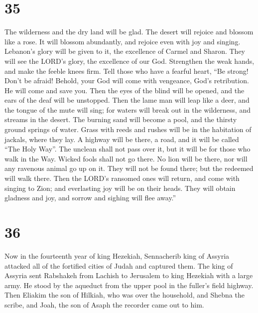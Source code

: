 \hypertarget{section-34}{%
\section{35}\label{section-34}}

 The wilderness and the dry land will be glad. The desert
will rejoice and blossom like a rose.  It will blossom
abundantly, and rejoice even with joy and singing. Lebanon's glory will
be given to it, the excellence of Carmel and Sharon. They will see the
LORD's glory, the excellence of our God.  Strengthen the
weak hands, and make the feeble knees firm.  Tell those
who have a fearful heart, ``Be strong! Don't be afraid! Behold, your God
will come with vengeance, God's retribution. He will come and save you.
 Then the eyes of the blind will be opened, and the ears
of the deaf will be unstopped.  Then the lame man will
leap like a deer, and the tongue of the mute will sing; for waters will
break out in the wilderness, and streams in the desert. 
The burning sand will become a pool, and the thirsty ground springs of
water. Grass with reeds and rushes will be in the habitation of jackals,
where they lay.  A highway will be there, a road, and it
will be called ``The Holy Way''. The unclean shall not pass over it, but
it will be for those who walk in the Way. Wicked fools shall not go
there.  No lion will be there, nor will any ravenous
animal go up on it. They will not be found there; but the redeemed will
walk there.  Then the LORD's ransomed ones will return,
and come with singing to Zion; and everlasting joy will be on their
heads. They will obtain gladness and joy, and sorrow and sighing will
flee away.''

\hypertarget{section-35}{%
\section{36}\label{section-35}}

 Now in the fourteenth year of king Hezekiah, Sennacherib
king of Assyria attacked all of the fortified cities of Judah and
captured them.  The king of Assyria sent Rabshakeh from
Lachish to Jerusalem to king Hezekiah with a large army. He stood by the
aqueduct from the upper pool in the fuller's field highway.
 Then Eliakim the son of Hilkiah, who was over the
household, and Shebna the scribe, and Joah, the son of Asaph the
recorder came out to him.

